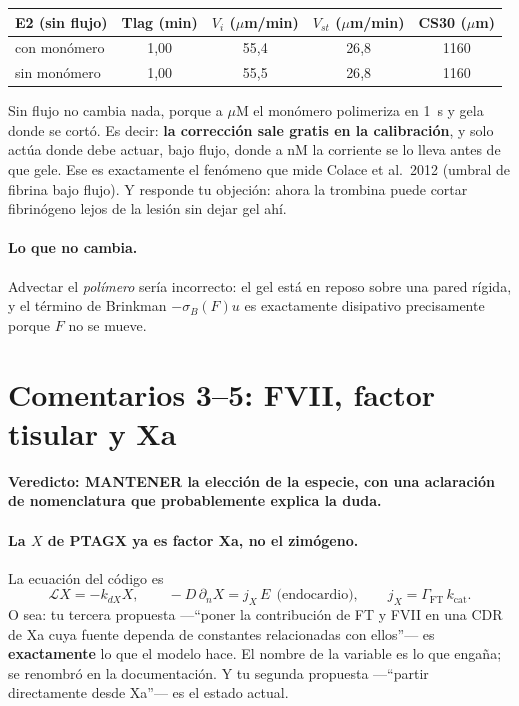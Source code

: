 \documentclass[11pt,a4paper]{article}
\newcommand{\MANT}{\textcolor{keep}{\textbf{MANTENER}}}
\begin{document}
\begin{center}
\small
\begin{tabular}{@{}lcccc@{}}
\toprule
E2 (sin flujo) & Tlag (min) & $V_i$ ($\mu$m/min) & $V_{st}$ ($\mu$m/min) & CS30 ($\mu$m) \\
\midrule
con monómero  & 1{,}00 & 55{,}4 & 26{,}8 & 1160 \\
sin monómero  & 1{,}00 & 55{,}5 & 26{,}8 & 1160 \\
\bottomrule
\end{tabular}
\end{center}

\noindent
Sin flujo no cambia nada, porque a $\mu$M el monómero polimeriza en 1~s y gela
donde se cortó. Es decir: \textbf{la corrección sale gratis en la calibración}, y
solo actúa donde debe actuar, bajo flujo, donde a nM la corriente se lo lleva antes
de que gele. Ese es exactamente el fenómeno que mide Colace et al.~2012 (umbral de
fibrina bajo flujo). Y responde tu objeción: ahora la trombina puede cortar
fibrinógeno lejos de la lesión sin dejar gel ahí.

\paragraph{Lo que no cambia.} Advectar el \emph{polímero} sería incorrecto: el gel
está en reposo sobre una pared rígida, y el término de Brinkman
$-\sigma_B(F)u$ es exactamente disipativo precisamente porque $F$ no se mueve.

\section{Comentarios 3--5: FVII, factor tisular y Xa}

\textbf{Veredicto: \MANT{} la elección de la especie, con una aclaración de
nomenclatura que probablemente explica la duda.}

\paragraph{La $X$ de PTAGX ya es factor Xa, no el zimógeno.} La ecuación del
código es
%
\begin{equation}
\mathcal{L}X=-k_{dX}X,
\qquad
-D\,\partial_n X = j_X\,E \ \ \text{(endocardio)},
\qquad
j_X=\Gamma_{\mathrm{FT}}\,k_{\mathrm{cat}} .
\end{equation}
%
O sea: tu tercera propuesta ---``poner la contribución de FT y FVII en una CDR de
Xa cuya fuente dependa de constantes relacionadas con ellos''--- es
\textbf{exactamente} lo que el modelo hace. El nombre de la variable es lo que
engaña; se renombró en la documentación. Y tu segunda propuesta ---``partir
directamente desde Xa''--- es el estado actual.
\end{document}
